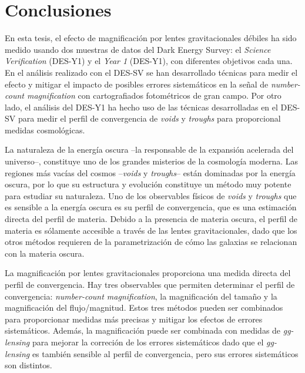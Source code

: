 \section*{Conclusiones}
En esta tesis, el efecto de magnificaci\'on por lentes gravitacionales d\'ebiles ha sido medido usando dos muestras de datos del Dark Energy Survey: el {\it Science Verification} (DES-Y1) y el {\it Year 1} (DES-Y1), con diferentes objetivos cada una. En el an\'alisis realizado con el DES-SV se han desarrollado t\'ecnicas para medir el efecto y mitigar el impacto de posibles errores sistem\'aticos en la se\~nal de {\it number-count magnification} con cartografiados fotom\'etricos de gran campo. Por otro lado, el an\'alisis del DES-Y1 ha hecho uso de las t\'ecnicas desarrolladas en el DES-SV para medir el perfil de convergencia de {\it voids} y {\it troughs} para proporcional medidas cosmol\'ogicas.
\newline

La naturaleza de la energ\'ia oscura --la responsable de la expansi\'on acelerada del universo--, constituye uno de los grandes misterios de la cosmolog\'ia moderna. Las regiones m\'as vac\'ias del cosmos --{\it voids} y {\it troughs}-- est\'an dominadas por la energ\'ia oscura, por lo que su estructura y evoluci\'on constituye un m\'etodo muy potente para estudiar su naturaleza. Uno de los observables f\'isicos de {\it voids} y {\it troughs} que es sensible a la energ\'ia oscura es su perfil de convergencia, que es una estimaci\'on directa del perfil de materia. Debido a la presencia de materia oscura, el perfil de materia es s\'olamente accesible a trav\'es de las lentes gravitacionales, dado que los otros m\'etodos requieren de la parametrizaci\'on de c\'omo las galaxias se relacionan con la materia oscura.
\newline

La magnificaci\'on por lentes gravitacionales proporciona una medida directa del perfil de convergencia. Hay tres observables que permiten determinar el perfil de convergencia: {\it number-count magnification}, la magnificaci\'on del tama\~no y la magnificaci\'on del flujo/magnitud. Estos tres m\'etodos pueden ser combinados para proporcionar medidas m\'as precisas y mitigar los efectos de errores sistem\'aticos. Adem\'as, la magnificaci\'on puede ser combinada con medidas de {\it gg-lensing} para mejorar la correci\'on de los errores sistem\'aticos dado que el {\it gg-lensing} es tambi\'en sensible al perfil de convergencia, pero sus errores sistem\'aticos son distintos.
\newline

